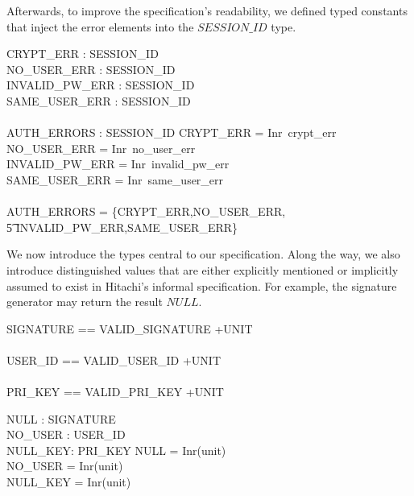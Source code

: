 \documentclass[a4paper,pdftex]{article}
\newcommand{\pplus}{+}
\begin{document}
Afterwards, to improve the specification's readability, we defined typed
constants that inject the error elements into the  $SESSION\_ID$ type.
\begin{axdef}
CRYPT\_ERR       : SESSION\_ID\\
NO\_USER\_ERR    : SESSION\_ID\\
INVALID\_PW\_ERR : SESSION\_ID\\
SAME\_USER\_ERR  : SESSION\_ID\\
\\
AUTH\_ERRORS     : \power SESSION\_ID
\where
CRYPT\_ERR = Inr~crypt\_err \\
NO\_USER\_ERR = Inr~no\_user\_err \\
INVALID\_PW\_ERR = Inr~invalid\_pw\_err \\
SAME\_USER\_ERR = Inr~same\_user\_err \\
\\
AUTH\_ERRORS = \{CRYPT\_ERR,NO\_USER\_ERR,\\
\t5            INVALID\_PW\_ERR,SAME\_USER\_ERR\}
\end{axdef}

We now introduce the types central to our specification.  Along the way,
we also introduce distinguished values that are either explicitly mentioned
or implicitly assumed to exist in Hitachi's informal specification. For example,
the signature generator may return the result $NULL$.

\begin{zed}
SIGNATURE == VALID\_SIGNATURE \pplus UNIT \\
\\
USER\_ID == VALID\_USER\_ID \pplus UNIT\\
\\
PRI\_KEY == VALID\_PRI\_KEY \pplus UNIT
\end{zed}

\begin{axdef}
NULL    : SIGNATURE\\
NO\_USER : USER\_ID\\
NULL\_KEY: PRI\_KEY
\where
NULL = Inr(unit)\\
NO\_USER = Inr(unit)\\
NULL\_KEY = Inr(unit)
\end{axdef}
\end{document}
